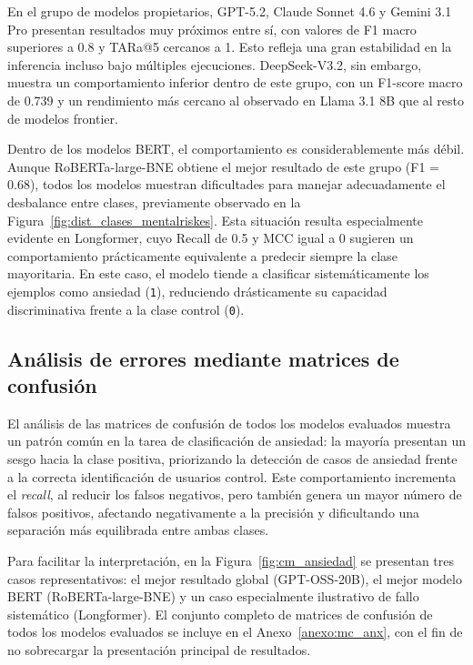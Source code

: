 En el grupo de modelos propietarios, GPT-5.2, Claude Sonnet 4.6 y Gemini 3.1 Pro presentan resultados muy próximos entre sí, con valores de F1 macro superiores a 0.8 y \ac{TARa@5} cercanos a 1. Esto refleja una gran estabilidad en la inferencia incluso bajo múltiples ejecuciones. DeepSeek-V3.2, sin embargo, muestra un comportamiento inferior dentro de este grupo, con un F1-score macro de 0.739 y un rendimiento más cercano al observado en Llama 3.1 8B que al resto de modelos frontier.

Dentro de los modelos BERT, el comportamiento es considerablemente más débil. Aunque RoBERTa-large-BNE obtiene el mejor resultado de este grupo (F1 = 0.68), todos los modelos muestran dificultades para manejar adecuadamente el desbalance entre clases, previamente observado en la Figura~\ref{fig:dist_clases_mentalriskes}. Esta situación resulta especialmente evidente en Longformer, cuyo Recall de 0.5 y \ac{MCC} igual a 0 sugieren un comportamiento prácticamente equivalente a predecir siempre la clase mayoritaria. En este caso, el modelo tiende a clasificar sistemáticamente los ejemplos como ansiedad (\texttt{1}), reduciendo drásticamente su capacidad discriminativa frente a la clase control (\texttt{0}).

\subsection{Análisis de errores mediante matrices de confusión}

El análisis de las matrices de confusión de todos los modelos evaluados muestra un patrón común en la tarea de clasificación de ansiedad: la mayoría presentan un sesgo hacia la clase positiva, priorizando la detección de casos de ansiedad frente a la correcta identificación de usuarios control. Este comportamiento incrementa el \textit{recall}, al reducir los falsos negativos, pero también genera un mayor número de falsos positivos, afectando negativamente a la precisión y dificultando una separación más equilibrada entre ambas clases.

Para facilitar la interpretación, en la Figura~\ref{fig:cm_ansiedad} se presentan tres casos representativos: el mejor resultado global (GPT-OSS-20B), el mejor modelo BERT (RoBERTa-large-BNE) y un caso especialmente ilustrativo de fallo sistemático (Longformer). El conjunto completo de matrices de confusión de todos los modelos evaluados se incluye en el Anexo~\ref{anexo:mc_anx}, con el fin de no sobrecargar la presentación principal de resultados.

